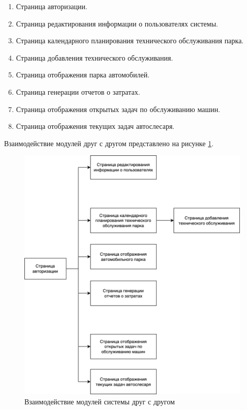 \documentclass[../nirs.tex]{subfiles}
\begin{document}
    \begin{enumerate}
        \item Страница авторизации.
        \item Страница редактирования информации о пользователях системы.
        \item Страница календарного планирования технического обслуживания парка.
        \item Страница добавления технического обслуживания.
        \item Страница отображения парка автомобилей.
        \item Страница генерации отчетов о затратах.
        \item Страница отображения открытых задач по обслуживанию машин.
        \item Страница отображения текущих задач автослесаря.
    \end{enumerate}

    Взаимодействие модулей друг с другом представлено на рисунке \ref{fig:pages}.

    \begin{figure}
        \centering
        \includegraphics[width=\textwidth]{images/pages.png}
        \caption{Взаимодействие модулей системы друг с другом}
        \label{fig:pages}
    \end{figure}
\end{document}
